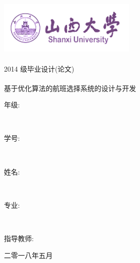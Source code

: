 \documentclass[fontset=fandol,a4paper,zihao=5]{ctexart}
\begin{document}
  
	\begin{titlepage}\heiti \begin{center} %
			\includegraphics[width=0.5\textwidth]{pic/logo.png} \\
			[0.3cm]\ \\
          {2014 级毕业设计(论文)} \\
			[0.5cm]\ \\
            [0.4cm] { 基于优化算法的航班选择系统的设计与开发}
      \\[4.3cm]
			\begin{minipage}[t]{0.7\textwidth} 
				\centering
                 {年\quad\quad 级:} 
				\uline{}\par
			\end{minipage}
			\\[0.6cm]
			\begin{minipage}[t]{0.7\textwidth}
				\centering
                 {学\quad\quad 号:} 
                \uline{}\par
			\end{minipage}
			\\[0.6cm]
			\begin{minipage}[t]{0.7\textwidth}
				\centering
                 {姓\quad\quad 名:} 
				\uline{}\par
			\end{minipage}
			\\[0.6cm]
			\begin{minipage}[t]{0.7\textwidth}
				\centering
                 {专\quad\quad 业:} 
				\uline{}\par
			\end{minipage}
			\\[0.6cm]
			\begin{minipage}[t]{0.7\textwidth}
				\centering
                 {指导教师:} 
				\uline{}\par
			\end{minipage}
			\vfill %
        { 二零一八年五月} \end{center}
    \end{titlepage}
	\begin{center}
	\end{center}
\end{document}

